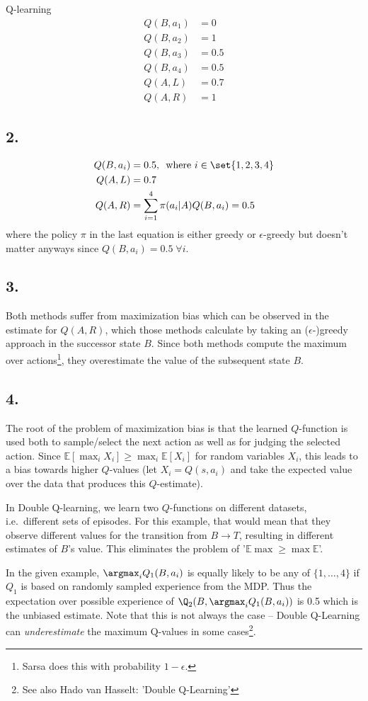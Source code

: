 \documentclass{article}
\begin{document}
Q-learning
\begin{align*}
Q(B, a_1) &= 0\\
Q(B, a_2) &= 1\\
Q(B, a_3) &= 0.5\\
Q(B, a_4) &= 0.5\\
Q(A, L) &=  0.7\\
Q(A, R) &=  1
\end{align*}



\subsection*{2.}
\begin{align*}
Q(B, a_i) &= 0.5 ,\, \text{ where  }i\in\set{1,2,3,4}\\
Q(A, L) &= 0.7\\
Q(A, R) &= \sum_{i=1}^4 \pi(a_i|A) Q(B,a_i) = 0.5
\end{align*}
where the policy \(\pi\) in the last equation is either greedy or \(\epsilon\)-greedy but doesn't matter
anyways since \(Q(B, a_i) = 0.5\; \forall i\).

\subsection*{3.}
Both methods suffer from maximization bias which can be observed in the estimate for $Q(A,R)$, which those methods calculate by taking an ($\epsilon$-)greedy approach in the successor state $B$. Since both methods compute the maximum over actions\footnote{Sarsa does this with probability $1-\epsilon$.}, they overestimate the value of the subsequent state $B$.


\subsection*{4.}
The root of the problem of maximization bias is that the learned $Q$-function is used both to sample/select the next action as well as for judging the selected action. Since \(\mathbb{E}[\max_i X_i] \geq \max_i \mathbb{E}[X_i]\) for random variables \(X_i\), this leads to a bias towards higher \(Q\)-values (let \(X_i = Q(s, a_i)\) and take the expected value over the data that produces this \(Q\)-estimate).

In Double Q-learning, we learn two $Q$-functions on different datasets, i.e.\ different sets of episodes. For this example, that would mean that they observe different values for the transition from $B\to T$, resulting in different estimates of $B$'s value. This eliminates the problem of '\(\mathbb{E}\max \geq \max \mathbb{E}\)'.

In the given example, \(\argmax_i Q_1(B, a_i)\) is equally likely to be any of \(\{1, \ldots, 4\}\) if \(Q_1\) is based on randomly sampled experience from the MDP. Thus the expectation over possible experience of \(\Q_2(B, \argmax_i Q_1(B, a_i))\) is 0.5 which is the unbiased estimate. Note that this is not always the case -- Double Q-Learning can \emph{underestimate} the maximum Q-values in some cases\footnote{See also {Hado van Hasselt: 'Double Q-Learning'}}.

 
\end{document}
